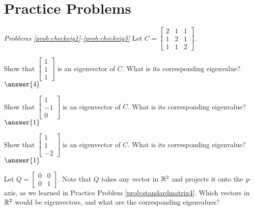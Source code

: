 \documentclass{ximera}
\begin{document}
\section*{Practice Problems}

\emph{Problems \ref{prob:checkeig1}-\ref{prob:checkeig3}}
Let $C=\begin{bmatrix} 2 & 1 & 1\\ 1 & 2 & 1\\ 1 & 1 & 2\end{bmatrix}$.  

\begin{problem}\label{prob:checkeig1}
Show that $\begin{bmatrix} 1\\1\\1 \end{bmatrix}$ is an eigenvector of $C$.  What is its corresponding eigenvalue?
$\answer{4}$
\end{problem}

 \begin{problem}\label{prob:checkeig2}
Show that $\begin{bmatrix} 1\\-1\\0 \end{bmatrix}$ is an eigenvector of $C$.  What is its corresponding eigenvalue?
$\answer{1}$
\end{problem}

 \begin{problem}\label{prob:checkeig3}
Show that $\begin{bmatrix} 1\\1\\-2 \end{bmatrix}$ is an eigenvector of $C$.  What is its corresponding eigenvalue?
$\answer{1}$
\end{problem}


\begin{problem}\label{prob:eigprojmatrix} 
Let $Q=\begin{bmatrix} 0& 0\\ 0&1\end{bmatrix}$.  Note that $Q$ takes any vector in $\mathbb{R}^2$ and projects it onto the $y$-axis, as we learned in Practice Problem \ref{prob:standardmatrix4}.  Which vectors in $\mathbb{R}^2$ would be eigenvectors, and what are the corresponding eigenvalues?
\end{problem}
\end{document}
